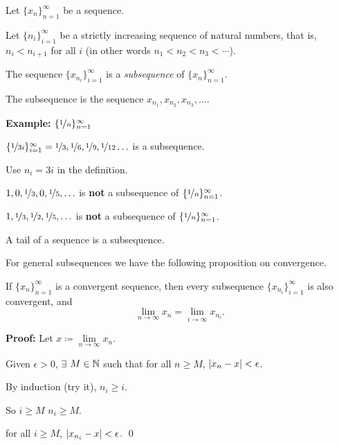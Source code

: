 \documentclass[10pt,aspectratio=169]{beamer}
\begin{document}
\begin{frame}
\begin{definition}
Let $\{ x_n \}_{n=1}^\infty$ be a sequence.

\pause
Let $\{ n_i \}_{i=1}^\infty$ be a strictly increasing sequence of natural
numbers, that is, $n_i < n_{i+1}$ for all $i$ (in other words $n_1 < n_2 < n_3 < \cdots$).  

\pause
The sequence
\quad $\{ x_{n_i} \}_{i=1}^\infty$ \quad
is a \emph{subsequence} of $\{ x_n \}_{n=1}^\infty$.
\end{definition}

\pause

The subsequence is the sequence $x_{n_1},x_{n_2},x_{n_3},\ldots$.

\medskip
\pause

\textbf{Example:} $\{ \nicefrac{1}{n} \}_{n=1}^\infty$

\pause
$\{ \nicefrac{1}{3i} \}_{i=1}^\infty =
\nicefrac{1}{3},\nicefrac{1}{6},\nicefrac{1}{9},\nicefrac{1}{12}\ldots$ is a subsequence.

\pause
Use $n_i = 3i$ in the definition.

\medskip
\pause

$1,0,\nicefrac{1}{3},0, \nicefrac{1}{5},\ldots$ is \textbf{not} a
subsequence of $\{ \nicefrac{1}{n} \}_{n=1}^\infty$.

\medskip
\pause

$1,\nicefrac{1}{3},\nicefrac{1}{2},\nicefrac{1}{5},\ldots$
is \textbf{not} a subsequence of $\{ \nicefrac{1}{n} \}_{n=1}^\infty$.

\end{frame}

\begin{frame}

A tail of a sequence is a subsequence.

\medskip
\pause

For general subsequences we have the following proposition on convergence.

\pause

\begin{proposition}
If $\{ x_n \}_{n=1}^\infty$ is a convergent sequence,
then every subsequence $\{ x_{n_i} \}_{i=1}^\infty$ is also convergent, and
\[
\lim_{n\to \infty} x_n = 
\lim_{i\to \infty} x_{n_i} .
\]
\end{proposition}

\pause

\textbf{Proof:}
Let $x \coloneqq \lim\limits_{n\to \infty} x_n$.

\medskip
\pause
Given $\epsilon > 0$, $\exists$ $M \in {\mathbb{N}}$ such that for all $n \geq M$,
$\left\lvert {x_n - x} \right\rvert < \epsilon$.

\medskip
\pause
By induction (try it), $n_i \geq i$.

\medskip
\pause
So \quad $i \geq M$ \wthus $n_i \geq M$.

\medskip
\pause
\thus \quad for all $i \geq M$, \quad
$\left\lvert {x_{n_i} - x} \right\rvert < \epsilon$.
\qed

\end{frame}
\end{document}
